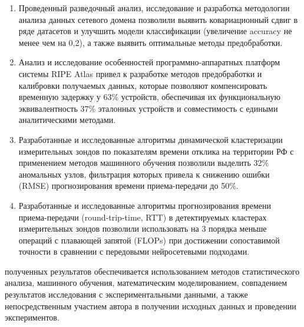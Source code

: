 {}
\begin{enumerate}[beginpenalty=10000]
	\item Проведенный разведочный анализ, исследование и разработка методологии анализа данных сетевого домена позволили выявить ковариационный сдвиг в ряде датасетов и улучшить модели классификации (увеличение accuracy не менее чем на 0,2), а также выявить оптимальные методы предобработки.
	
	\item Анализ и исследование особенностей программно-аппаратных платформ системы RIPE Atlas привел к разработке методов предобработки и калибровки получаемых данных, которые позволяют компенсировать временную задержку у 63\% устройств, обеспечивая их функциональную эквивалентность 37\% эталонных устройств и совместимость с едиными аналитическими методами.
	
	\item Разработанные и исследованные алгоритмы динамической кластеризации измерительных зондов по показателям времени отклика на территории РФ с применением методов машинного обучения позволили выделить 32\% аномальных узлов, фильтрация которых привела к снижению ошибки (RMSE) прогнозирования времени приема-передачи до 50\%.
	
	\item Разработанные и исследованные алгоритмы прогнозирования времени приема-передачи (round-trip-time, RTT) в детектируемых кластерах измерительных зондов позволили использовать на 3 порядка меньше операций с плавающей запятой (FLOPs) при достижении сопоставимой точности в сравнении с передовыми нейросетевыми подходами.
	
\end{enumerate}



{\reliability} \phantom{ } полученных результатов \phantom{ } обеспечивается использованием методов статистического анализа, машинного обучения, математическим моделированием, совпадением результатов исследования с экспериментальными данными, а также непосредственным участием автора в получении исходных данных и проведении экспериментов.


